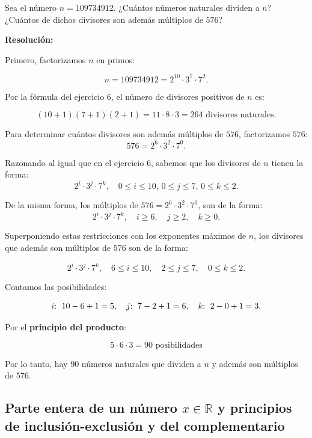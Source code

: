 \documentclass[a4paper,12pt]{article}
\begin{document}
\begin{ejercicio}[title=Ejercicio 7]
Sea el número $n = 109734912$. ¿Cuántos números naturales dividen a $n$? ¿Cuántos de dichos divisores son además múltiplos de $576$?

\tcblower
\textbf{Resolución:}

Primero, factorizamos $n$ en primos:

\[
n = 109734912 = 2^{10} \cdot 3^7 \cdot 7^2.
\]

Por la fórmula del ejercicio 6, el número de divisores positivos de $n$ es:

\[
(10+1)(7+1)(2+1) = 11 \cdot 8 \cdot 3 = \boxed{264} \text{ divisores naturales}.
\]

Para determinar cuántos divisores son además múltiplos de $576$, factorizamos $576$:
\[
576 = 2^6 \cdot 3^2 \cdot 7^0.
\]

Razonando al igual que en el ejercicio 6, sabemos que los divisores de $n$ tienen la forma:
\[
2^i \cdot 3^j \cdot 7^k, \quad 0 \le i \le 10, \, 0 \le j \le 7, \, 0 \le k \le 2.
\]

\vspace{0.5em}

De la misma forma, los múltiplos de $576 = 2^6 \cdot 3^2 \cdot 7^0$, son de la forma:
\[
2^i \cdot 3^j \cdot 7^k, \quad i \ge 6, \quad j \ge 2, \quad k \ge 0.
\]

Superponiendo estas restricciones con los exponentes máximos de $n$, los divisores que además son múltiplos de $576$ son de la forma:

\[
2^i \cdot 3^j \cdot 7^k, \quad 6 \le i \le 10, \quad 2 \le j \le 7, \quad 0 \le k \le 2.
\]

Contamos las posibilidades:

\[
i\text{: \,} 10 - 6 + 1 = 5, \quad j\text{: \,} 7 - 2 + 1 = 6, \quad k\text{: \,} 2 - 0 + 1 = 3.
\]

Por el \textbf{principio del producto}:

\[
5 \cdot 6 \cdot 3 = 90 \text{ posibilidades}
\]

Por lo tanto, hay \(\boxed{90}\) números naturales que dividen a $n$ y además son múltiplos de $576$.

\end{ejercicio}

\subsection{Parte entera de un número $x \in \mathbb{R}$ y principios de inclusión-exclusión y del complementario}
\end{document}

